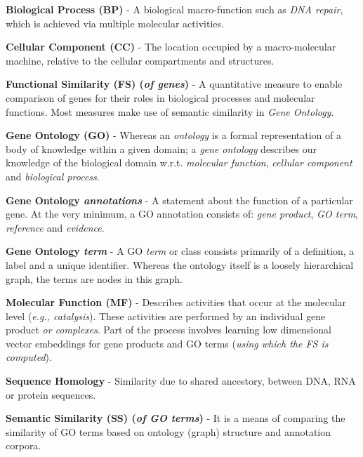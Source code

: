 \begin{mybox}
    \textbf{Biological Process (BP)} - A biological macro-function such as \textit{DNA repair}, which is achieved via multiple molecular activities. \cite{GOdoc}
\end{mybox}

\begin{mybox}
    \textbf{Cellular Component (CC)} - The location occupied by a macro-molecular machine, relative to the cellular compartments and structures. \cite{GOdoc}
\end{mybox}

\begin{mybox}
    \textbf{Functional Similarity (FS) (\textit{of genes})} - A quantitative measure to enable comparison of genes for their roles in biological processes and molecular functions. Most measures make use of semantic similarity in \textit{Gene Ontology}.
\end{mybox}

\begin{mybox}
    \textbf{Gene Ontology (GO)} - Whereas an \textit{ontology} is a formal representation of a body of knowledge within a given domain; a \textit{gene ontology} describes our knowledge of the biological domain w.r.t. \textit{molecular function}, \textit{cellular component} and \textit{biological process}. \cite{GOdoc}
\end{mybox}

\begin{mybox}
    \textbf{Gene Ontology \textit{annotations}} - A statement about the function of a particular gene. At the very minimum, a GO annotation consists of: \textit{gene product}, \textit{GO term}, \textit{reference} and \textit{evidence}. \cite{GOdoc}
\end{mybox}

\begin{mybox}
    \textbf{Gene Ontology \textit{term}} - A GO \textit{term} or class consists primarily of a definition, a label and a unique identifier. Whereas the ontology itself is a loosely hierarchical graph, the terms are nodes in this graph. \cite{GOdoc}
\end{mybox}

\begin{mybox}
    \textbf{Molecular Function (MF)} - Describes activities that occur at the molecular level (\textit{e.g., catalysis}). These activities are performed by an individual gene product \textit{or complexes}. Part of the process involves learning low dimensional vector embeddings for gene products and GO terms (\textit{using which the FS is computed}).  \cite{GOdoc}
\end{mybox}

\begin{mybox}
    \textbf{Sequence Homology} - Similarity due to shared ancestory, between DNA, RNA or protein sequences.
\end{mybox}

\begin{mybox}
    \textbf{Semantic Similarity (SS) (\textit{of GO terms})} - It is a means of comparing the similarity of GO terms based on ontology (graph) structure and annotation corpora.
\end{mybox}
